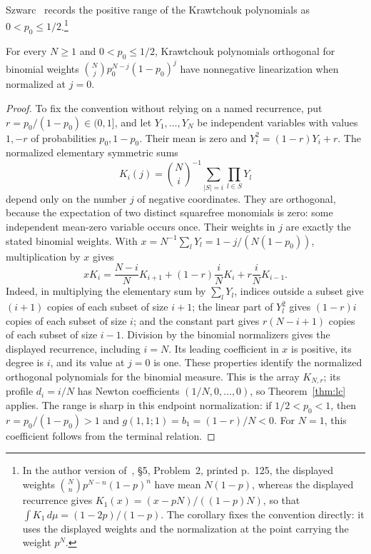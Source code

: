 Szwarc~\cite[\S5, Problem~2]{szwarc} records the positive range of the Krawtchouk polynomials as $0<p_0\leq1/2$.\footnote{In the author version of~\cite{szwarc}, \S5, Problem~2, printed p.~125, the displayed weights $\binom Nn p^{N-n}(1-p)^n$ have mean $N(1-p)$, whereas the displayed recurrence gives $K_1(x)=(x-pN)/((1-p)N)$, so that $\int K_1\,d\mu=(1-2p)/(1-p)$. The corollary fixes the convention directly: it uses the displayed weights and the normalization at the point carrying the weight $p^N$.}

\begin{corollary}\label{cor:kraw}
For every $N\geq1$ and $0<p_0\leq1/2$, Krawtchouk polynomials orthogonal for binomial weights $\binom Nj p_0^{N-j}(1-p_0)^j$ have nonnegative linearization when normalized at $j=0$.
\end{corollary}
\begin{proof}
To fix the convention without relying on a named recurrence, put $r=p_0/(1-p_0)\in(0,1]$, and let $Y_1,\ldots,Y_N$ be independent variables with values $1,-r$ of probabilities $p_0,1-p_0$. Their mean is zero and $Y_i^2=(1-r)Y_i+r$. The normalized elementary symmetric sums
\[
K_i(j)=\binom Ni^{-1}\sum_{|S|=i}\prod_{l\in S}Y_l
\]
depend only on the number $j$ of negative coordinates. They are orthogonal, because the expectation of two distinct squarefree monomials is zero: some independent mean-zero variable occurs once. Their weights in $j$ are exactly the stated binomial weights. With $x=N^{-1}\sum_lY_l=1-j/(N(1-p_0))$, multiplication by $x$ gives
\[
xK_i=\frac{N-i}{N}K_{i+1}+(1-r)\frac iN K_i+r\frac iN K_{i-1}.
\]
Indeed, in multiplying the elementary sum by $\sum_lY_l$, indices outside a subset give $(i+1)$ copies of each subset of size $i+1$; the linear part of $Y_l^2$ gives $(1-r)i$ copies of each subset of size $i$; and the constant part gives $r(N-i+1)$ copies of each subset of size $i-1$. Division by the binomial normalizers gives the displayed recurrence, including $i=N$. Its leading coefficient in $x$ is positive, its degree is $i$, and its value at $j=0$ is one. These properties identify the normalized orthogonal polynomials for the binomial measure. This is the array $K_{N,r}$; its profile $d_i=i/N$ has Newton coefficients $(1/N,0,\ldots,0)$, so Theorem~\ref{thm:lc} applies.
The range is sharp in this endpoint normalization: if $1/2<p_0<1$, then
$r=p_0/(1-p_0)>1$ and $g(1,1;1)=b_1=(1-r)/N<0$.
For $N=1$, this coefficient follows from the terminal relation.
\end{proof}

